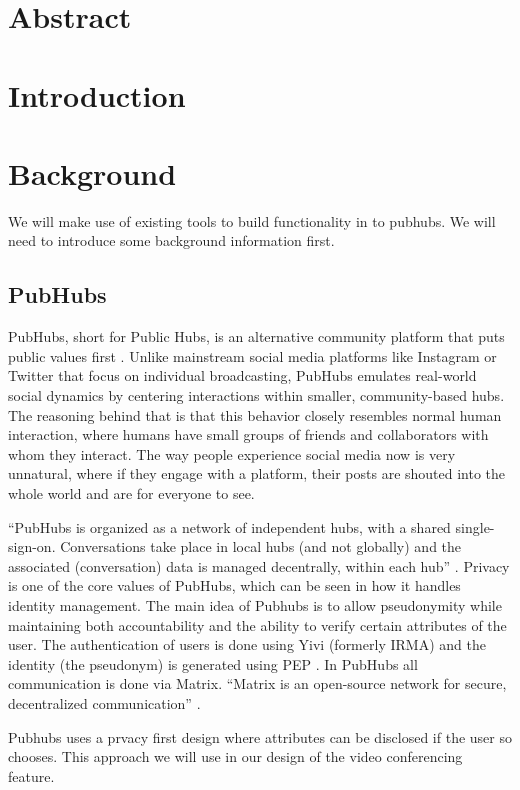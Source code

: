 \documentclass{report}
\theoremstyle{definition}
\theoremstyle{remark}
\begin{document}
\newpage
\section*{Abstract}

\section{Introduction}
\section{Background}
We will make use of existing tools to build functionality in to pubhubs. We will need to introduce some background information first. 

\subsection{PubHubs}
PubHubs, short for Public Hubs, is an alternative community platform that puts public values first \cite{jacobs_pubhubs_2023}. Unlike mainstream social media platforms like Instagram or Twitter that focus on individual broadcasting, PubHubs emulates real-world social dynamics by centering interactions within smaller, community-based hubs. The reasoning behind that is that this behavior closely resembles normal human interaction, where humans have small groups of friends and collaborators with whom they interact. The way people experience social media now is very unnatural, where if they engage with a platform, their posts are shouted into the whole world and are for everyone to see.

“PubHubs is organized as a network of independent hubs, with a shared single-sign-on. Conversations take place in local hubs (and not globally) and the associated (conversation) data is managed decentrally, within each hub” \cite{jacobs_pubhubs_2023}. Privacy is one of the core values of PubHubs, which can be seen in how it handles identity management. The main idea of Pubhubs is to allow pseudonymity while maintaining both accountability and the ability to verify certain attributes of the user. The authentication of users is done using Yivi (formerly IRMA)\cite{alpar_irma_nodate} and the identity (the pseudonym) is generated using PEP \cite{verheul_polymorphic_2016}. In PubHubs all communication is done via Matrix. “Matrix is an open-source network for secure, decentralized communication” \cite{noauthor_matrixorg_nodate}.

Pubhubs uses a prvacy first design where attributes can be disclosed if the user so chooses. This approach we will use in our design of the video conferencing feature.
\end{document}
